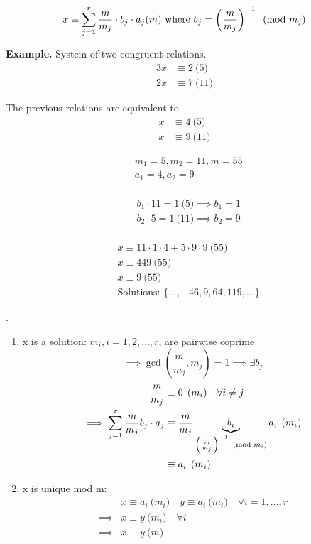 \[
  x \equiv \sum_{j=1}^r \frac {m}{m_j} \cdot b_j \cdot a_j (m) \text{ where }
  b_j = \left( \frac{m}{m_j} \right) ^{-1} \imod{m_j}
\]

\textbf{Example.}
System of two congruent relations.
\begin{align*}
  3x &\equiv 2 \pod{5} \\
  2x &\equiv 7 \pod{11}
\end{align*}

The previous relations are equivalent to
\begin{align*}
  x &\equiv 4 \pod{5} \\
  x &\equiv 9 \pod{11}
\end{align*}
\begin{minipage}[t]{0.5\textwidth}
\begin{align*}
  &m_1 = 5, m_2 = 11, m = 55 \\
  &a_1 = 4, a_2 = 9 \\
\end{align*}
\end{minipage}
\begin{minipage}[t]{0.5\textwidth}
\begin{align*}
  &b_1 \cdot 11 = 1 \pod{5}  \implies b_1 = 1 \\
  &b_2 \cdot 5 = 1  \pod{11} \implies b_2 = 9 \\
\end{align*}
\end{minipage}
\begin{align*}
  & x \equiv 11 \cdot 1 \cdot 4 + 5 \cdot9 \cdot9 \pod{55}\\
  & x \equiv 449 \pod{55} \\
  & x \equiv 9 \pod{55} \\
  & \text{Solutions: } \{\dots, -46, 9, 64, 119, \dots \}
\end{align*}

\Proof.

\begin{enumerate}[1)]

  \item x is a solution: $m_i, i = 1,2, \ldots, r$, are pairwise coprime
  \[
    \implies \gcd\left(\frac{m}{m_j}, m_j\right) = 1 \implies \exists b_j
  \]
  \begin{align*}
    \frac{m}{m_j} &\equiv 0 \pod{m_i} \quad \forall i \neq j \\
    \implies \sum_{j=1}^{r}\frac{m}{m_j} b_j \cdot a_j &\equiv
      \frac{m}{m_j} \underbrace{b_i}_{\left(\frac{m}{m_j}\right)^{-1} \imod{m_i}} a_i \pod{m_i} \\
    &\equiv a_i \pod{m_i}
  \end{align*}

  \item x is unique mod m:
  \begin{align*}
    & x \equiv a_i\pod{m_i} \quad y \equiv a_i \pod{m_i} \quad \forall i = 1,\ldots, r \\
    \implies & x \equiv y \pod{m_i} \quad \forall i \\
    \implies & x \equiv y \pod{m}
  \end{align*}

\end{enumerate}


